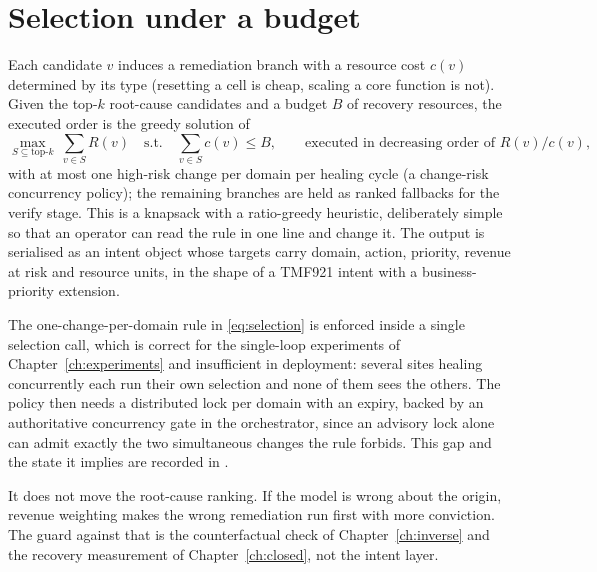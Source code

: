 \section{Selection under a budget}
Each candidate $v$ induces a remediation branch with a resource cost $c(v)$ determined by its type
(resetting a cell is cheap, scaling a core function is not). Given the top-$k$ root-cause
candidates and a budget $B$ of recovery resources, the executed order is the greedy solution of
\begin{equation}
\max_{S\subseteq\text{top-}k}\ \sum_{v\in S}R(v)\quad\text{s.t.}\quad\sum_{v\in S}c(v)\le B,
\qquad\text{executed in decreasing order of }R(v)/c(v),
\label{eq:selection}
\end{equation}
with at most one high-risk change per domain per healing cycle (a change-risk concurrency policy);
the remaining branches are held as ranked fallbacks for the verify stage. This is a knapsack with a
ratio-greedy heuristic, deliberately simple so that an operator can read the rule in one line and
change it. The output is serialised as an intent object whose targets
carry domain, action, priority, revenue at risk and resource units, in the shape of a TMF921
intent with a business-priority extension.

\begin{remark}
The one-change-per-domain rule in \eqref{eq:selection} is enforced inside a single selection call,
which is correct for the single-loop experiments of Chapter~\ref{ch:experiments} and insufficient
in deployment: several sites healing concurrently each run their own selection and none of them
sees the others. The policy then needs a distributed lock per domain with an expiry, backed by an
authoritative concurrency gate in the orchestrator, since an advisory lock alone can admit exactly
the two simultaneous changes the rule forbids. This gap and the state it implies are recorded in
.
\end{remark}

\begin{remark}
It does not move the root-cause ranking. If the model is wrong about the origin, revenue
weighting makes the wrong remediation run first with more conviction. The guard against that is
the counterfactual check of Chapter~\ref{ch:inverse} and the recovery measurement of
Chapter~\ref{ch:closed}, not the intent layer.
\end{remark}
